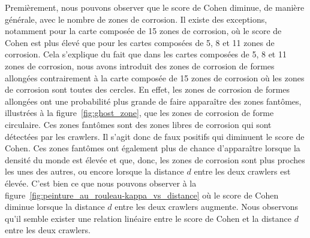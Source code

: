 \documentclass[francais,RandD]{rapportPFE}
\begin{document}
			Premièrement, nous pouvons observer que le score de Cohen diminue, de manière générale, avec le nombre de zones de corrosion.
			Il existe des exceptions, notamment pour la carte composée de 15 zones de corrosion, où le score de Cohen est plus élevé que pour les cartes composées de 5, 8 et 11 zones de corrosion.
			Cela s'explique du fait que dans les cartes composées de 5, 8 et 11 zones de corrosion, nous avons introduit des zones de corrosion de formes allongées contrairement à la carte composée de 15 zones de corrosion où les zones de corrosion sont toutes des cercles.
			En effet, les zones de corrosion de formes allongées ont une probabilité plus grande de faire apparaître des zones fantômes, illustrées à la figure~\ref{fig:ghost_zone}, que les zones de corrosion de forme circulaire.
			Ces zones fantômes sont des zones libres de corrosion qui sont détectées par les crawlers.
			Il s'agit donc de faux positifs qui diminuent le score de Cohen.
			Ces zones fantômes ont également plus de chance d'apparaître lorsque la densité du monde est élevée et que, donc, les zones de corrosion sont plus proches les unes des autres, ou encore lorsque la distance $d$ entre les deux crawlers est élevée.
			C'est bien ce que nous pouvons observer à la figure~\ref{fig:peinture_au_rouleau-kappa_vs_distance} où le score de Cohen diminue lorsque la distance $d$ entre les deux crawlers augmente.
			Nous observons qu'il semble exister une relation linéaire entre le score de Cohen et la distance $d$ entre les deux crawlers.
\end{document}
